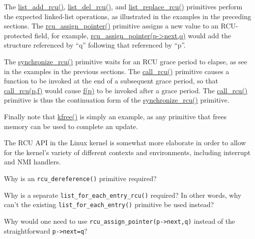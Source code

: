 The \url{list_add_rcu()}, \url{list_del_rcu()}, and
\url{list_replace_rcu()} primitives perform the expected linked-list
operations, as illustrated in the examples in the preceding sections.
The \url{rcu_assign_pointer()} primitive assigns a new value to an
RCU-protected field, for example, \url{rcu_assign_pointer(p->next,q)}
would add the structure referenced by ``q'' following that referenced
by ``p''.

The \url{synchronize_rcu()} primitive waits for an RCU grace period
to elapse, as see in the examples in the previous sections.
The \url{call_rcu()} primitive causes a function to be invoked
at the end of a subsequent grace period, so that \url{call_rcu(p,f)}
would cause \url{f(p)} to be invoked after a grace period.
The \url{call_rcu()} primitive is thus the continuation form of the
\url{synchronize_rcu()} primitive.

Finally note that \url{kfree()} is simply an example, as any primitive
that frees memory can be used to complete an update.

The RCU API in the Linux kernel is somewhat more elaborate in order to
allow for the kernel's variety of different contexts and environments,
including interrupt and NMI handlers.

\QuickQuiz{}
	Why is an {\tt rcu\_dereference()} primitive required?
 \QuickQuizEnd

\QuickQuiz{}
	Why is a separate {\tt list\_for\_each\_entry\_rcu()} required?
	In other words, why can't the existing
	{\tt list\_for\_each\_entry()} primitive be used instead?
 \QuickQuizEnd

\QuickQuiz{}
	Why would one need to use {\tt rcu\_assign\_pointer(p->next,q)}
	instead of the straightforward {\tt p->next=q}?
 \QuickQuizEnd

